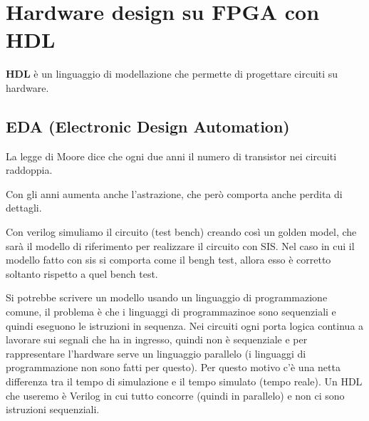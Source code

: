 \documentclass[a4paper]{article}
\theoremstyle{break}
\theoremstyle{break}
\theoremstyle{break}
\theoremstyle{break}
\begin{document}
\section{Hardware design su FPGA con HDL}
\textbf{HDL} è un linguaggio di modellazione che permette di progettare circuiti su hardware.
\subsection{EDA (Electronic Design Automation)}
La legge di Moore dice che ogni due anni il numero di transistor nei circuiti raddoppia.

Con gli anni aumenta anche l'astrazione, che però comporta anche perdita di dettagli.

Con verilog simuliamo il circuito (test bench) creando così un golden model, che sarà il
modello di riferimento per realizzare il circuito con SIS. Nel caso in cui il modello fatto con sis
si comporta come il bengh test, allora esso è corretto soltanto rispetto a quel bench test.

Si potrebbe scrivere un modello usando un linguaggio di programmazione comune, il problema è che 
i linguaggi di programmazinoe sono sequenziali e quindi eseguono le istruzioni in sequenza.
Nei circuiti ogni porta logica continua a lavorare sui segnali che ha in ingresso, quindi
non è sequenziale e per rappresentare l'hardware serve un linguaggio parallelo (i linguaggi di 
programmazione non sono fatti per questo). Per questo motivo c'è una netta differenza tra il tempo
di simulazione e il tempo simulato (tempo reale). Un HDL che useremo è Verilog in cui tutto concorre
(quindi in parallelo) e non ci sono istruzioni sequenziali.
\end{document}
